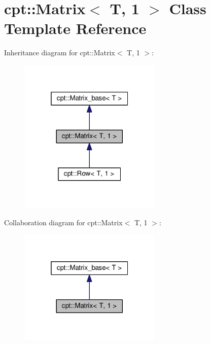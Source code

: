 \hypertarget{classcpt_1_1Matrix_3_01T_00_011_01_4}{}\section{cpt\+:\+:Matrix$<$ T, 1 $>$ Class Template Reference}
\label{classcpt_1_1Matrix_3_01T_00_011_01_4}


Inheritance diagram for cpt\+:\+:Matrix$<$ T, 1 $>$\+:
\nopagebreak
\begin{figure}[H]
\begin{center}
\leavevmode
\includegraphics[width=193pt]{classcpt_1_1Matrix_3_01T_00_011_01_4__inherit__graph}
\end{center}
\end{figure}


Collaboration diagram for cpt\+:\+:Matrix$<$ T, 1 $>$\+:
\nopagebreak
\begin{figure}[H]
\begin{center}
\leavevmode
\includegraphics[width=193pt]{classcpt_1_1Matrix_3_01T_00_011_01_4__coll__graph}
\end{center}
\end{figure}

